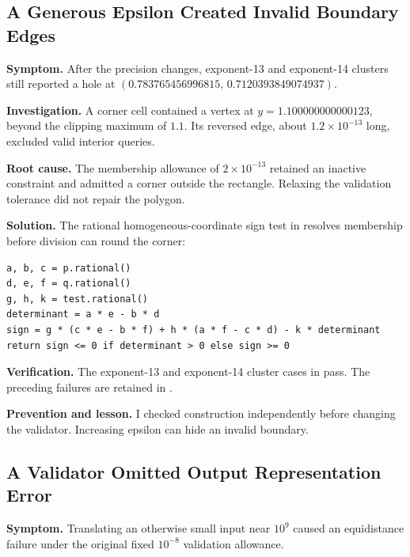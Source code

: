 \clearpage
\subsection{A Generous Epsilon Created Invalid Boundary Edges}
\label{prob:epsilon}

\textbf{Symptom.} After the precision changes, exponent-13 and exponent-14 clusters still reported a hole at \((0.783765456996815,\,0.7120393849074937)\).

\textbf{Investigation.} A corner cell contained a vertex at \(y=1.100000000000123\), beyond the clipping maximum of \(1.1\). Its reversed edge, about \(1.2\times10^{-13}\) long, excluded valid interior queries.

\textbf{Root cause.} The membership allowance of \(2\times10^{-13}\) retained an inactive constraint and admitted a corner outside the rectangle. Relaxing the validation tolerance did not repair the polygon.

\textbf{Solution.} The rational homogeneous-coordinate sign test in  resolves membership before division can round the corner:

\noindent\begin{minipage}{\linewidth}
\begin{lstlisting}[caption={Resolve an uncertain corner-membership decision without inexact division.},label={lst:membership-fix}]
a, b, c = p.rational()
d, e, f = q.rational()
g, h, k = test.rational()
determinant = a * e - b * d
sign = g * (c * e - b * f) + h * (a * f - c * d) - k * determinant
return sign <= 0 if determinant > 0 else sign >= 0
\end{lstlisting}
\end{minipage}

\textbf{Verification.} The exponent-13 and exponent-14 cluster cases in  pass. The preceding failures are retained in .

\textbf{Prevention and lesson.} I checked construction independently before changing the validator. Increasing epsilon can hide an invalid boundary.

\clearpage
\subsection{A Validator Omitted Output Representation Error}

\textbf{Symptom.} Translating an otherwise small input near \(10^9\) caused an equidistance failure under the original fixed $10^{-8}$ validation allowance.

